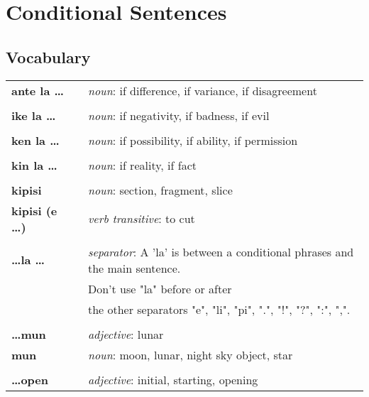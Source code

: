 \section{Conditional Sentences}
%
\subsection*{Vocabulary}
%
\begin{supertabular}{p{2,5cm}|ll}
\textbf{ante la \dots} && \textit{noun}: if difference, if variance, if disagreement  \\ %
 && \\ %
\textbf{ike la \dots} && \textit{noun}: if negativity, if badness, if evil \\ %
 && \\ %
\textbf{ken la \dots} && \textit{noun}: if possibility, if ability, if permission \\ %
 && \\ %
\textbf{kin la \dots} && \textit{noun}: if reality, if fact \\  %
 && \\ %
\textbf{kipisi } && \textit{noun}: section, fragment, slice \\ %
\textbf{kipisi (e \dots)} && \textit{verb transitive}: to cut \\ %
 && \\ %
\textbf{\dots la \dots} && \textit{separator}: A 'la' is between a conditional phrases and the main sentence. \\ &&  Don't use "la" before or after \\ && the other separators "e", "li", "pi", ".", "!", "?", ":", ",".  \\ %
 && \\ %
\textbf{\dots mun} && \textit{adjective}: lunar \\ %
\textbf{mun} && \textit{noun}: moon, lunar, night sky object, star \\ %
 && \\ %
\textbf{\dots open} && \textit{adjective}: initial, starting, opening \\ %

\end{supertabular}

